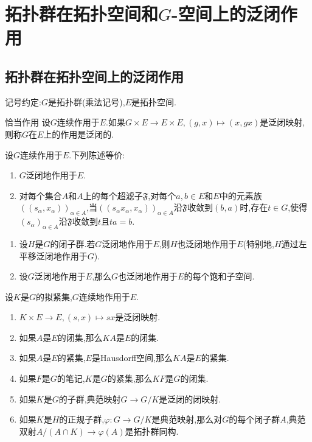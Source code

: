 \chapter{拓扑群在拓扑空间和\texorpdfstring{$G$}{G}-空间上的泛闭作用}

\section{拓扑群在拓扑空间上的泛闭作用}

记号约定:$G$是拓扑群(乘法记号),$E$是拓扑空间.

\begin{definition}{恰当作用}{}
	设$G$连续作用于$E$.如果$G\times E\to E\times E,\left(g,x\right)\mapsto\left(x,gx\right)$是泛闭映射,则称$G$在$E$上的作用是泛闭的.
\end{definition}

\begin{proposition}{}{}
	设$G$连续作用于$E$.下列陈述等价:
	\begin{enumerate}
		\item $G$泛闭地作用于$E$.
		\item 对每个集合$A$和$A$上的每个超滤子$\mathfrak{F}$,对每个$a,b\in E$和$E$中的元素族$\left(\left(s_{\alpha},x_{\alpha}\right)\right)_{\alpha\in A}$,当$\left(\left(s_{\alpha}x_{\alpha},x_{\alpha}\right)\right)_{\alpha\in A}$沿$\mathfrak{F}$收敛到$\left(b,a\right)$时,存在$t\in G$,使得$\left(s_{\alpha}\right)_{\alpha\in A}$沿$\mathfrak{F}$收敛到$t$且$ta=b$.
	\end{enumerate}
\end{proposition}

\begin{example}{}{}
	\begin{enumerate}
		\item 设$H$是$G$的闭子群.若$G$泛闭地作用于$E$,则$H$也泛闭地作用于$E$(特别地,$H$通过左平移泛闭地作用于$G$).
		\item 设$G$泛闭地作用于$E$,那么$G$也泛闭地作用于$E$的每个饱和子空间.
	\end{enumerate}
\end{example}

\begin{proposition}{}{}
	设$K$是$G$的拟紧集,$G$连续地作用于$E$.
	\begin{enumerate}
		\item $K\times E\to E,\left(s,x\right)\mapsto sx$是泛闭映射.
		\item 如果$A$是$E$的闭集,那么$KA$是$E$的闭集.
		\item 如果$A$是$E$的紧集,$E$是Hausdorff空间,那么$KA$是$E$的紧集.
		\item 如果$F$是$G$的笔记,$K$是$G$的紧集,那么$KF$是$G$的闭集.
		\item 如果$K$是$G$的子群,典范映射$G\to G/K$是泛闭的闭映射.
		\item 如果$K$是$H$的正规子群,$\varphi:G\to G/K$是典范映射,那么对$G$的每个闭子群$A$,典范双射$A/\left(A\cap K\right)\to\varphi\left(A\right)$是拓扑群同构.
	\end{enumerate}
\end{proposition}

